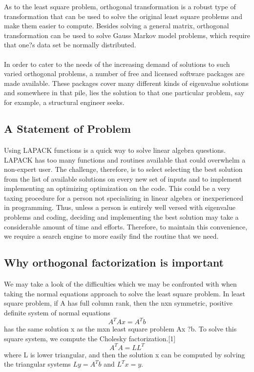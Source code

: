 \documentclass[pdftex,12pt,a4paper]{article}
\begin{document}
As to the least square problem, orthogonal transformation is a robust type of transformation that can be used to solve the original least square problems and make them easier to compute. Besides solving a general matrix, orthogonal transformation can be used to solve Gauss Markov model problems, which require that one?s data set be normally distributed.\paragraph{}
		
In order to cater to the needs of the increasing demand of solutions to such varied orthogonal problems, a number of free and licensed software packages are made available. These packages cover many different kinds of eigenvalue solutions and somewhere in that pile, lies the solution to that one particular problem, say for example, a structural engineer seeks. 

\subsection{A Statement of Problem} 
\paragraph{}
Using LAPACK functions is a quick way to solve linear algebra questions. LAPACK has too many functions and routines available that could overwhelm a non-expert user. The challenge, therefore, is to select selecting the best solution from the list of available solutions on every new set of inputs and to implement implementing an optimizing optimization on the code. This could be a very taxing procedure for a person not specializing in linear algebra or inexperienced in programming. Thus, unless a person is entirely well versed with eigenvalue problems and coding, deciding and implementing the best solution may take a considerable amount of time and efforts. Therefore, to maintain this convenience, we require a search engine to more easily find the routine that we need.

\subsection{Why orthogonal factorization is important} 
\paragraph{}
We may take a look of the difficulties which we may be confronted with when taking the normal equations approach to solve the least square problem. In least square problem, if A has full column rank, then the nxn symmetric, positive definite system of normal equations 
\begin{equation}
A^{T}Ax=A^{T}b
\end{equation}
has the same solution x as the mxn least square problem Ax ?b. To solve this square system, we compute the Cholesky factorization.[1]
\begin{equation}
A^{T}A=LL^{T}
\end{equation}
where L is lower triangular, and then the solution x can be computed by solving the triangular systems $Ly=A^{T}b$ and $L^{T}x=y$.
\end{document}

